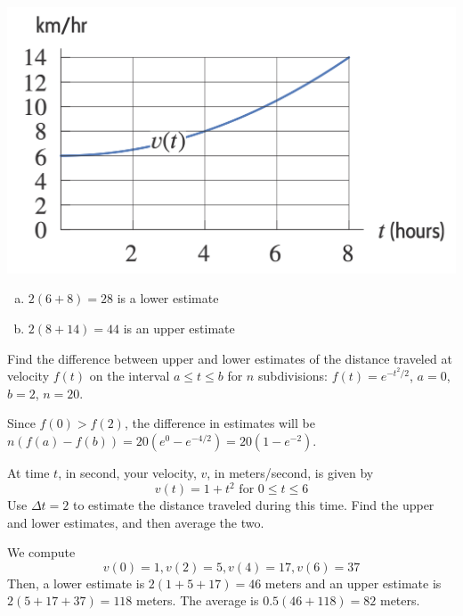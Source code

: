 \documentclass[11pt]{exam}
\begin{document}
\begin{questions}
  \begin{center}
    \includegraphics[scale=0.3]{Figures/figure514.png}
  \end{center}
  \begin{solution}
    \begin{enumerate}[(a)]
    \item \(2(6+8) = 28\) is a lower estimate
    \item \(2(8+14) = 44\) is an upper estimate
    \end{enumerate}
  \end{solution}
\question Find the difference between upper and lower estimates of the distance traveled at velocity $f(t)$ on the interval $a\leq t \leq b$ for $n$ subdivisions: $f(t) = e^{ - t^2 / 2 }$, $a=0$, $b=2$, $n=20$. 
  \begin{solution}
    Since \(f(0) > f(2)\), the difference in estimates will be
    \(n(f(a)-f(b)) = 20(e^0-e^{-4/2}) = 20(1-e^{-2})\). 
  \end{solution}
\question At time \(t\), in second, your velocity, \(v\), in
  meters/second, is given by \[
    v(t) = 1+t^2 \text{ for }0 \leq t \leq 6
  \]
  Use \(\Delta t = 2\) to estimate the distance traveled during this
  time. Find the upper and lower estimates, and then average the two.
  \begin{solution}
    We compute \[
      v(0) = 1, v(2) = 5, v(4) = 17, v(6) = 37
    \]
    Then, a lower estimate is \(2(1+5+17) = 46\) meters and an upper
    estimate is \(2(5+17+37) = 118\) meters. The average is
    \(0.5(46+118) = 82\) meters.
  \end{solution}
\end{questions}
\end{document}
